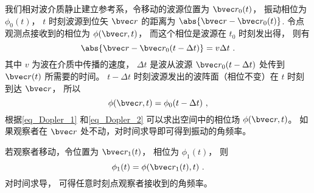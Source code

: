 

我们相对波介质静止建立参考系，令移动的波源位置为 $\bvec r_0(t)$， 振动相位为 $\phi_0(t)$， $t$ 时刻波源到位矢 $\bvec r$ 的距离为 $\abs{\bvec r - \bvec r_0(t)}$. 令点观测点接收到的相位为 $\phi(\bvec r, t)$， 而这个相位是波源在 $t_0$ 时刻发出得， 则有
\begin{equation}\label{eq_Dopler_1}
\abs{\bvec r - \bvec r_0(t-\Delta t)} = v\Delta t~.
\end{equation}
其中 $v$ 为波在介质中传播的速度， $\Delta t$ 是波从波源 $\bvec r_0(t - \Delta t)$ 处传到 $\bvec r(t)$ 所需要的时间。 $t - \Delta t$ 时刻波源发出的波阵面（相位不变）在 $t$ 时刻到达 $\bvec r$， 所以
\begin{equation}\label{eq_Dopler_2}
\phi(\bvec r, t) = \phi_0(t - \Delta t)~,
\end{equation}
根据\autoref{eq_Dopler_1} 和\autoref{eq_Dopler_2} 可以求出空间中的相位场 $\phi(\bvec r, t)$。 如果观察者在 $\bvec r$ 处不动，对时间求导即可得到振动的角频率。

若观察者移动，令位置为 $\bvec r_1(t)$， 相位为 $\phi_1(t)$， 则
\begin{equation}\label{eq_Dopler_3}
\phi_1(t) = \phi(\bvec r_1(t), t)~.
\end{equation}
对时间求导， 可得任意时刻点观察者接收到的角频率。


